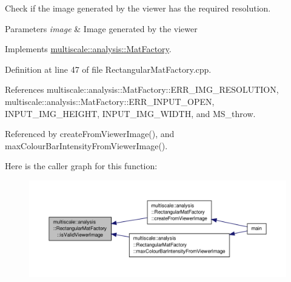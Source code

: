 Check if the image generated by the viewer has the required resolution. 


\begin{DoxyParams}{Parameters}
{\em image} & Image generated by the viewer \\
\hline
\end{DoxyParams}


Implements \hyperlink{classmultiscale_1_1analysis_1_1MatFactory_ad6acdd120b128eb9fb502fca23a7de69}{multiscale\-::analysis\-::\-Mat\-Factory}.



Definition at line 47 of file Rectangular\-Mat\-Factory.\-cpp.



References multiscale\-::analysis\-::\-Mat\-Factory\-::\-E\-R\-R\-\_\-\-I\-M\-G\-\_\-\-R\-E\-S\-O\-L\-U\-T\-I\-O\-N, multiscale\-::analysis\-::\-Mat\-Factory\-::\-E\-R\-R\-\_\-\-I\-N\-P\-U\-T\-\_\-\-O\-P\-E\-N, I\-N\-P\-U\-T\-\_\-\-I\-M\-G\-\_\-\-H\-E\-I\-G\-H\-T, I\-N\-P\-U\-T\-\_\-\-I\-M\-G\-\_\-\-W\-I\-D\-T\-H, and M\-S\-\_\-throw.



Referenced by create\-From\-Viewer\-Image(), and max\-Colour\-Bar\-Intensity\-From\-Viewer\-Image().



Here is the caller graph for this function\-:
\nopagebreak
\begin{figure}[H]
\begin{center}
\leavevmode
\includegraphics[width=350pt]{classmultiscale_1_1analysis_1_1RectangularMatFactory_a398913bbfa8ca9d80cb630c29a37a135_icgraph}
\end{center}
\end{figure}


